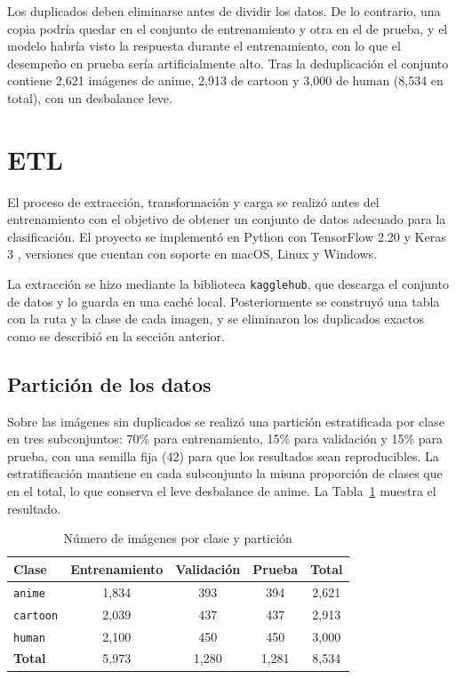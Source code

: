 \documentclass[letterpaper, 10 pt, conference]{ieeeconf}
\begin{document}
Los duplicados deben eliminarse antes de dividir los datos. De lo contrario, una copia podría quedar en el conjunto de entrenamiento y otra en el de prueba, y el modelo habría visto la respuesta durante el entrenamiento, con lo que el desempeño en prueba sería artificialmente alto. Tras la deduplicación el conjunto contiene 2,621 imágenes de anime, 2,913 de cartoon y 3,000 de human (8,534 en total), con un desbalance leve.


\section{ETL}

El proceso de extracción, transformación y carga se realizó antes del entrenamiento con el objetivo de obtener un conjunto de datos adecuado para la clasificación. El proyecto se implementó en Python con TensorFlow 2.20 y Keras 3 \cite{tensorflow, keras}, versiones que cuentan con soporte en macOS, Linux y Windows.

La extracción se hizo mediante la biblioteca \texttt{kagglehub}, que descarga el conjunto de datos y lo guarda en una caché local. Posteriormente se construyó una tabla con la ruta y la clase de cada imagen, y se eliminaron los duplicados exactos como se describió en la sección anterior.

\subsection{Partición de los datos}

Sobre las imágenes sin duplicados se realizó una partición estratificada por clase en tres subconjuntos: 70\% para entrenamiento, 15\% para validación y 15\% para prueba, con una semilla fija (42) para que los resultados sean reproducibles. La estratificación mantiene en cada subconjunto la misma proporción de clases que en el total, lo que conserva el leve desbalance de anime. La Tabla~\ref{tab:particion} muestra el resultado.

\begin{table}[H]
\caption{Número de imágenes por clase y partición}
\label{tab:particion}
\centering
\footnotesize
\begin{tabular}{lcccc}
\hline
\textbf{Clase} & \textbf{Entrenamiento} & \textbf{Validación} & \textbf{Prueba} & \textbf{Total} \\
\hline
\texttt{anime}   & 1,834 & 393   & 394   & 2,621 \\
\texttt{cartoon} & 2,039 & 437   & 437   & 2,913 \\
\texttt{human}   & 2,100 & 450   & 450   & 3,000 \\
\hline
\textbf{Total}   & 5,973 & 1,280 & 1,281 & 8,534 \\
\hline
\end{tabular}
\end{table}
\end{document}
